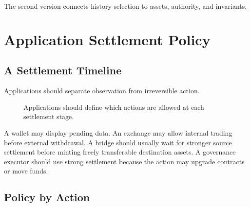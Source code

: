 The second version connects history selection to assets, authority, and invariants.

\section{Application Settlement Policy}

\subsection{A Settlement Timeline}

Applications should separate observation from irreversible action.

\begin{figure}[htbp]
\centering
{}
\caption{Applications should define which actions are allowed at each settlement stage.}
\end{figure}

A wallet may display pending data. An exchange may allow internal trading before external withdrawal. A bridge should usually wait for stronger source settlement before minting freely transferable destination assets. A governance executor should use strong settlement because the action may upgrade contracts or move funds.

\subsection{Policy by Action}

